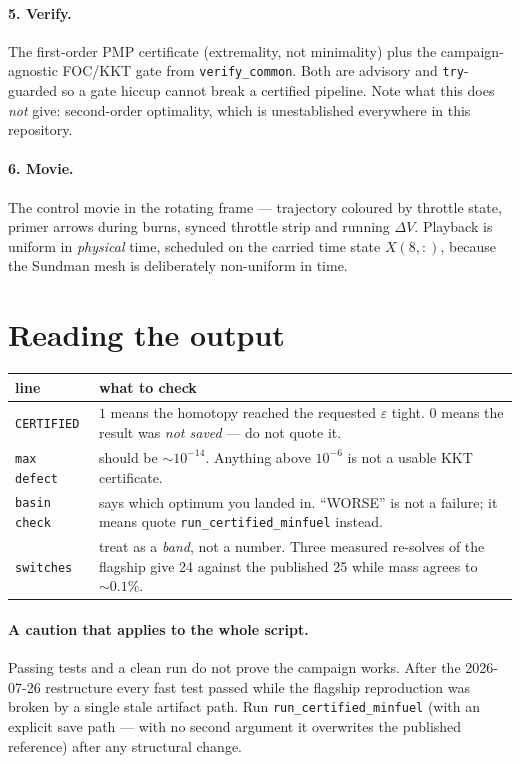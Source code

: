 \documentclass[11pt]{article}
\newcommand{\file}[1]{\texttt{#1}}
\begin{document}
\paragraph{5. Verify.} The first-order PMP certificate (extremality, not
minimality) plus the campaign-agnostic FOC/KKT gate from \file{verify\_common}.
Both are advisory and \texttt{try}-guarded so a gate hiccup cannot break a
certified pipeline. Note what this does \emph{not} give: second-order
optimality, which is unestablished everywhere in this repository.

\paragraph{6. Movie.} The control movie in the rotating frame --- trajectory
coloured by throttle state, primer arrows during burns, synced throttle strip
and running $\Delta V$. Playback is uniform in \emph{physical} time, scheduled
on the carried time state $X(8,:)$, because the Sundman mesh is deliberately
non-uniform in time.

\section{Reading the output}

\begin{center}
\begin{tabular}{lp{8.2cm}}
\toprule
line & what to check \\
\midrule
\texttt{CERTIFIED} & $1$ means the homotopy reached the requested $\varepsilon$
  tight. $0$ means the result was \emph{not saved} --- do not quote it. \\
\texttt{max defect} & should be ${\sim}10^{-14}$. Anything above $10^{-6}$ is
  not a usable KKT certificate. \\
\texttt{basin check} & says which optimum you landed in. ``WORSE'' is not a
  failure; it means quote \file{run\_certified\_minfuel} instead. \\
\texttt{switches} & treat as a \emph{band}, not a number. Three measured
  re-solves of the flagship give 24 against the published 25 while mass agrees
  to ${\sim}0.1\%$. \\
\bottomrule
\end{tabular}
\end{center}

\paragraph{A caution that applies to the whole script.} Passing tests and a
clean run do not prove the campaign works. After the 2026-07-26 restructure
every fast test passed while the flagship reproduction was broken by a single
stale artifact path. Run \file{run\_certified\_minfuel} (with an explicit save
path --- with no second argument it overwrites the published reference) after
any structural change.
\end{document}
